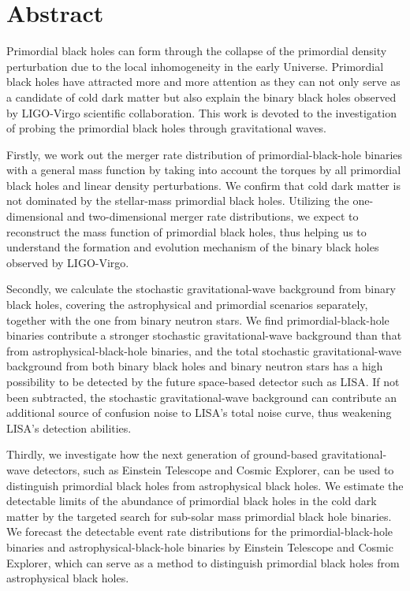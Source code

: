 \intobmk\chapter*{Abstract}%

Primordial black holes can form through the collapse of the primordial density perturbation due to the local inhomogeneity in the early Universe. Primordial black holes have attracted more and more attention as they can not only serve as a candidate of cold dark matter but also explain the binary black holes observed by LIGO-Virgo scientific collaboration. This work is devoted to the investigation of probing the primordial black holes through gravitational waves.

Firstly, we work out the merger rate distribution of primordial-black-hole binaries with a general mass function by taking into account the torques by all primordial black holes and linear density perturbations. We confirm that cold dark matter is not dominated by the stellar-mass primordial black holes. Utilizing the one-dimensional and two-dimensional merger rate distributions, we expect to reconstruct the mass function of primordial black holes, thus helping us to understand the formation and evolution mechanism of the binary black holes observed by LIGO-Virgo. 


Secondly, we calculate the stochastic gravitational-wave background from binary black holes, covering the astrophysical and primordial scenarios separately, together with the one from binary neutron stars. We find primordial-black-hole binaries contribute a stronger stochastic gravitational-wave background than that from astrophysical-black-hole binaries, and the total stochastic gravitational-wave background from both binary black holes and binary neutron stars has a high possibility to be detected by the future space-based detector such as LISA. If not been subtracted, the stochastic gravitational-wave background can contribute an additional source of confusion noise to LISA's total noise curve, thus weakening LISA's detection abilities. 

Thirdly, we investigate how the next generation of ground-based gravitational-wave detectors, such as Einstein Telescope and Cosmic Explorer, can be used to distinguish primordial black holes from astrophysical black holes. We estimate the detectable limits of the abundance of primordial black holes in the cold dark matter by the targeted search for sub-solar mass primordial black hole binaries. We forecast the detectable event rate distributions for the primordial-black-hole binaries and astrophysical-black-hole binaries by Einstein Telescope and Cosmic Explorer, which can serve as a method to distinguish primordial black holes from astrophysical black holes.

